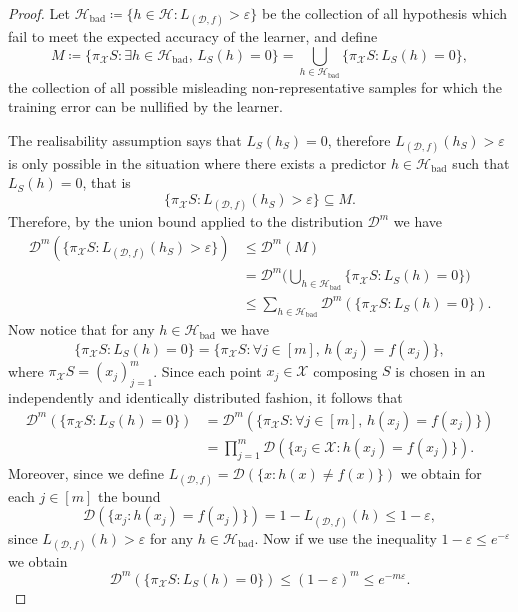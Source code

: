 \begin{proof}
    Let
    \(\mathcal{H}_{\text{bad}} \coloneq \{h \in \mathcal{H} \colon L_{(\mathcal{D},
            f)} > \varepsilon\}\) be the collection of all hypothesis which fail to meet
    the expected accuracy of the learner, and define
    \[
        M \coloneq
        \{\pi_{\mathcal{X}} S \colon \exists h \in \mathcal{H}_{\text{bad}},\, L_S(h) = 0\}
        = \bigcup_{h \in \mathcal{H}_{\text{bad}}}
        \{\pi_{\mathcal{X}} S \colon L_S(h) = 0\},
    \]
    the collection of all possible misleading non-representative samples for which
    the training error can be nullified by the learner.

    The realisability assumption says that \(L_S(h_S) = 0\), therefore
    \(L_{(\mathcal{D}, f)}(h_S) > \varepsilon\) is only possible in the situation
    where there exists a predictor \(h \in \mathcal{H}_{\text{bad}}\) such that
    \(L_S(h) = 0\), that is
    \[
        \{\pi_{\mathcal{X}} S \colon L_{(\mathcal{D}, f)}(h_S) > \varepsilon\} \subseteq M.
    \]
    Therefore, by the union bound applied to the distribution \(\mathcal{D}^m\) we have
    \begin{align*}
        \mathcal{D}^m(\{\pi_{\mathcal{X}} S \colon L_{(\mathcal{D}, f)}(h_S) > \varepsilon\})
         & \leq \mathcal{D}^m(M)                      \\
         & = \mathcal{D}^m \Big(
        \bigcup_{h \in \mathcal{H}_{\text{bad}}}
        \{\pi_{\mathcal{X}} S \colon L_S(h) = 0\}
        \Big)                                         \\
         & \leq \sum_{h \in \mathcal{H}_{\text{bad}}}
        \mathcal{D}^m(\{\pi_{\mathcal{X}} S \colon L_S(h) = 0\}).
    \end{align*}
    Now notice that for any \(h \in \mathcal{H}_{\text{bad}}\) we have
    \[
        \{\pi_{\mathcal{X}} S \colon L_S(h) = 0\}
        = \{\pi_{\mathcal{X}} S \colon \forall j \in [m],\, h(x_j) = f(x_j)\},
    \]
    where \(\pi_{\mathcal{X}} S = (x_j)_{j=1}^m\). Since each point \(x_j \in
    \mathcal{X}\) composing \(S\) is chosen in an independently and identically
    distributed fashion, it follows that
    \begin{align*}
        \mathcal{D}^m(\{\pi_{\mathcal{X}} S \colon L_S(h) = 0\})
         & = \mathcal{D}^m(
        \{\pi_{\mathcal{X}} S \colon \forall j \in [m],\, h(x_j) = f(x_j)\})            \\
         & = \prod_{j=1}^m \mathcal{D}(\{x_j \in \mathcal{X} \colon h(x_j) = f(x_j)\}).
    \end{align*}
    Moreover, since we define
    \(L_{(\mathcal{D}, f)} = \mathcal{D}(\{x \colon h(x) \neq f(x)\})\) we obtain
    for each \(j \in [m]\) the bound
    \[
        \mathcal{D}(\{x_j \colon h(x_j) = f(x_j)\})
        = 1 - L_{(\mathcal{D}, f)}(h)
        \leq 1 - \varepsilon,
    \]
    since \(L_{(\mathcal{D}, f)}(h) > \varepsilon\) for any
    \(h \in \mathcal{H}_{\text{bad}}\). Now if we use the inequality \(1 -
    \varepsilon \leq e^{-\varepsilon}\) we obtain
    \[
        \mathcal{D}^m(\{\pi_{\mathcal{X}} S \colon L_S(h) = 0\})
        \leq (1 - \varepsilon)^m
        \leq e^{-m \varepsilon}.
    \]


\end{proof}
